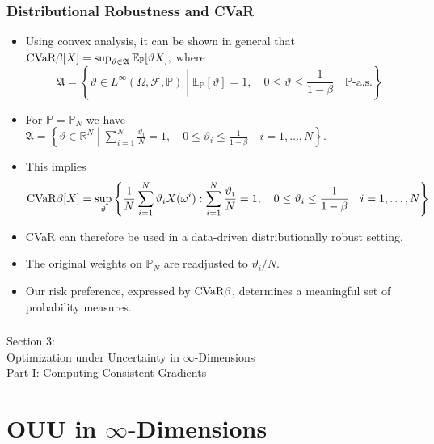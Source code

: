 \documentclass[aspectratio=169,xcolor=dvipsnames,10pt]{beamer}
\newcommand{\CVaR}{\textup{CVaR}}
\newcommand{\bbp}{\mathbb{P}}
\newcommand{\cF}{\mathcal{F}}
\begin{document}
\begin{frame}\frametitle{Distributional Robustness and CVaR}
\vspace{-1ex}
\begin{exampleblock}{}
\begin{itemize}
\item Using convex analysis, it can be shown in general that
$
\CVaR{\beta}[X] = \sup_{\vartheta \in \mathfrak{A}} \mathbb E_{\mathbb P}[\vartheta X],
$
where 
\[
\mathfrak{A} = \left\{\vartheta \in L^{\infty}(\Omega,\cF,\bbp) \; \left| \; \mathbb E_{\mathbb P}[\vartheta] = 1,\quad 0 \le \vartheta \le \frac{1}{1-\beta} \quad \mathbb P\textrm{-a.s.}\right.\right\}
\]
\item For $\bbp = \bbp_N$ we have
$
\mathfrak{A} = \left\{ \vartheta \in \mathbb R^{N} \; \left| \; \sum_{i=1}^{N} \frac{\vartheta_i}{N} = 1,\quad 0 \le \vartheta_i \le \frac{1}{1-\beta} \quad i=1,\dots,N \right.\right\}.
$
\item This implies 
\[
\CVaR{\beta}[X] = \sup_{\vartheta}\left\{ \frac{1}{N} \sum_{i=1}^{N} \vartheta_i X(\omega^i) :  \sum_{i=1}^{N} \frac{\vartheta_i}{N} = 1,\quad 0 \le \vartheta_i \le \frac{1}{1-\beta} \quad i=1,\dots,N\right\}
\]
\item CVaR can therefore be used in a data-driven distributionally robust setting.
\item The original weights on $\mathbb P_N$ are readjusted to  $\vartheta_i/N$. 
\item Our risk preference, expressed by $\CVaR{\beta}$, determines a meaningful set of probability measures.
\end{itemize}
\end{exampleblock}
\end{frame}

\begin{frame}\frametitle{}
\begin{center}\Large
Section 3: \\
Optimization under Uncertainty in $\infty$-Dimensions \\
Part I: Computing Consistent Gradients
\end{center}
\end{frame}


\section{OUU in $\infty$-Dimensions}
\end{document}
